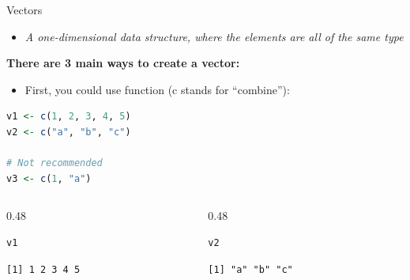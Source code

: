 \begin{frame}[fragile]{Vectors}
\begin{itemize}
  \item \textit{A one-dimensional data structure, where the elements are all of the same type}
\end{itemize}
\textbf{There are 3 main ways to create a vector:}\par\smallskip
\begin{itemize}
  \item First, you could use  function (c stands for “combine”):
\end{itemize}
\begin{lstlisting}[language=R]
v1 <- c(1, 2, 3, 4, 5)
v2 <- c("a", "b", "c")

# Not recommended
v3 <- c(1, "a")
\end{lstlisting}
\begin{columns}[T]
\begin{column}{0.48\textwidth}
\begin{lstlisting}[language=R]
v1
\end{lstlisting}
\begin{lstlisting}[style=output]
[1] 1 2 3 4 5
\end{lstlisting}
\end{column}
\begin{column}{0.48\textwidth}
\begin{lstlisting}[language=R]
v2
\end{lstlisting}
\begin{lstlisting}[style=output]
[1] "a" "b" "c"
\end{lstlisting}
\end{column}
\end{columns}
\end{frame}


